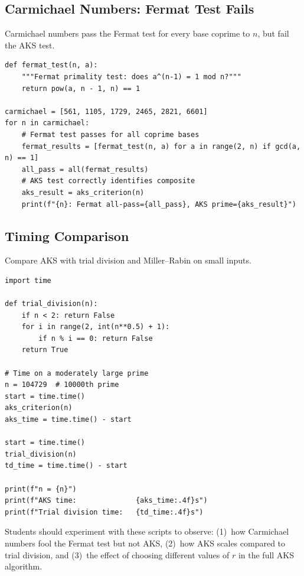 \subsection{Carmichael Numbers: Fermat Test Fails}

Carmichael numbers pass the Fermat test for every base coprime to $n$, but fail the AKS test.

\begin{verbatim}
def fermat_test(n, a):
    """Fermat primality test: does a^(n-1) = 1 mod n?"""
    return pow(a, n - 1, n) == 1

carmichael = [561, 1105, 1729, 2465, 2821, 6601]
for n in carmichael:
    # Fermat test passes for all coprime bases
    fermat_results = [fermat_test(n, a) for a in range(2, n) if gcd(a, n) == 1]
    all_pass = all(fermat_results)
    # AKS test correctly identifies composite
    aks_result = aks_criterion(n)
    print(f"{n}: Fermat all-pass={all_pass}, AKS prime={aks_result}")
\end{verbatim}

\subsection{Timing Comparison}

Compare AKS with trial division and Miller--Rabin on small inputs.

\begin{verbatim}
import time

def trial_division(n):
    if n < 2: return False
    for i in range(2, int(n**0.5) + 1):
        if n % i == 0: return False
    return True

# Time on a moderately large prime
n = 104729  # 10000th prime
start = time.time()
aks_criterion(n)
aks_time = time.time() - start

start = time.time()
trial_division(n)
td_time = time.time() - start

print(f"n = {n}")
print(f"AKS time:              {aks_time:.4f}s")
print(f"Trial division time:   {td_time:.4f}s")
\end{verbatim}

\begin{highlightbox}
Students should experiment with these scripts to observe: (1)~how Carmichael numbers fool the Fermat test but not AKS, (2)~how AKS scales compared to trial division, and (3)~the effect of choosing different values of $r$ in the full AKS algorithm.
\end{highlightbox}

